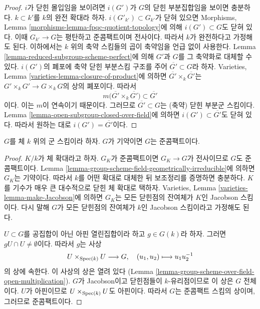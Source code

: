 \begin{proof}
$i$가 닫힌 몰입임을 보이려면 $i(G')$가 $G$의 닫힌 부분집합임을 보이면 충분하다.
$k \subset k'$를 $k$의 완전 확대라 하자. $i(G'_{k'}) \subset G_{k'}$가 닫혀 있으면
Morphisms, Lemma \ref{morphisms-lemma-fpqc-quotient-topology}에 의해
$i(G') \subset G$도 닫혀 있다. 이때 $G_{k'} \to G$는 평탄하고 준콤팩트이며 전사이다.
따라서 $k$가 완전하다고 가정해도 된다. 이하에서는 $k$ 위의 축약 스킴들의 곱이 축약임을
언급 없이 사용한다. Lemma \ref{lemma-reduced-subgroup-scheme-perfect}에 의해 $G'$과 $G$를
그 축약화로 대체할 수 있다. $i(G')$의 폐포에 축약 닫힌 부분스킴 구조를 주어
$\overline{G'} \subset G$라 하자. Varieties, Lemma \ref{varieties-lemma-closure-of-product}에 의하면
$\overline{G'} \times_k \overline{G'}$는 $G' \times_k G' \to G \times_k G$의 상의 폐포이다. 따라서
$$
m\Big(\overline{G'} \times_k \overline{G'}\Big)
\subset \overline{G'}
$$
이다. 이는 $m$이 연속이기 때문이다. 그러므로 $\overline{G'} \subset G$는 (축약) 닫힌 부분군 스킴이다.
Lemma \ref{lemma-open-subgroup-closed-over-field}에 의하면 $i(G') \subset \overline{G'}$도 닫혀 있다.
따라서 원하는 대로 $i(G') = \overline{G'}$이다.
\end{proof}

\begin{lemma}
\label{lemma-irreducible-group-scheme-over-field-qc}
$G$를 체 $k$ 위의 군 스킴이라 하자. $G$가 기약이면 $G$는 준콤팩트이다.
\end{lemma}

\begin{proof}
$K/k$가 체 확대라고 하자. $G_K$가 준콤팩트이면 $G_K \to G$가 전사이므로 $G$도 준콤팩트이다.
Lemma \ref{lemma-group-scheme-field-geometrically-irreducible}에 의하면 $G_K$는 기약이다. 따라서 $k$를
어떤 확대로 대체한 뒤 보조정리를 증명하면 충분하다. $K$를 기수가 매우 큰 대수적으로 닫힌
체 확대로 택하자. Varieties, Lemma \ref{varieties-lemma-make-Jacobson}에 의하면 $G_K$는
모든 닫힌점의 잔여체가 $K$인 Jacobson 스킴이다. 다시 말해 $G$가 모든 닫힌점의 잔여체가
$k$인 Jacobson 스킴이라고 가정해도 된다.

\medskip\noindent
$U \subset G$를 공집합이 아닌 아핀 열린집합이라 하고 $g \in G(k)$라 하자. 그러면
$gU \cap U \not = \emptyset$이다. 따라서 $g$는 사상
$$
U \times_{\mathop{\mathrm{Spec}}(k)} U \longrightarrow G, \quad
(u_1, u_2) \longmapsto u_1u_2^{-1}
$$
의 상에 속한다. 이 사상의 상은 열려 있다
(Lemma \ref{lemma-group-scheme-over-field-open-multiplication}). $G$가 Jacobson이고 닫힌점들이
$k$-유리점이므로 이 상은 $G$ 전체이다. $U$가 아핀이므로 $U \times_{\mathop{\mathrm{Spec}}(k)} U$도 아핀이다.
따라서 $G$는 준콤팩트 스킴의 상이며, 그러므로 준콤팩트이다.
\end{proof}

